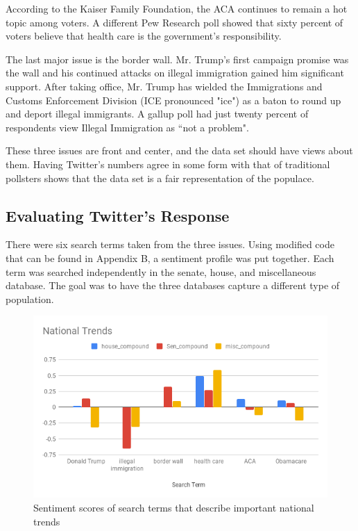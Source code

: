 \documentclass[11pt, twoside, reqno]{article}
\begin{document}
According to the Kaiser Family Foundation, the ACA continues to remain a hot topic among voters. A different Pew Research poll showed that sixty percent of voters believe that health care is the government's responsibility. 

The last major issue is the border wall. Mr. Trump's first campaign promise was the wall and his continued attacks on illegal immigration gained him significant support. After taking office, Mr. Trump has wielded the Immigrations and Customs Enforcement Division (ICE pronounced "ice") as a baton to round up and deport illegal immigrants. A gallup poll had just twenty percent of respondents view Illegal Immigration as ``not a problem". 

These three issues are front and center, and the data set should have views about them. Having Twitter's numbers agree in some form with that of traditional pollsters shows that the data set is a fair representation of the populace. 

\subsection{Evaluating Twitter's Response}
\hspace{0.2in}There were six search terms taken from the three issues. Using modified code that can be found in Appendix B, a sentiment profile was put together. Each term was searched independently in the senate, house, and miscellaneous database. The goal was to have the three databases capture a different type of population. 
\begin{figure}[H]
	\includegraphics[scale=0.65]{natty_trends}	
	\caption{Sentiment scores of search terms that describe important national trends}
	\label{fig:natty_trends}
\end{figure}
\end{document}
